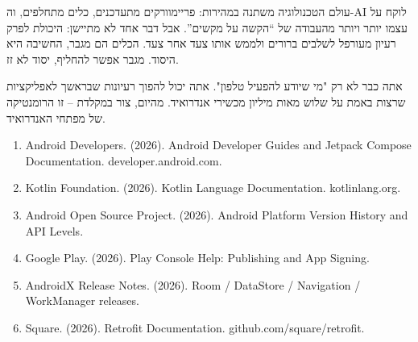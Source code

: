 עולם הטכנולוגיה משתנה במהירות: פריימוורקים מתעדכנים, כלים מתחלפים, וה-AI לוקח על עצמו יותר ויותר מהעבודה של “הקשה על מקשים”. אבל דבר אחד לא מתיישן: היכולת לפרק רעיון מעורפל לשלבים ברורים ולממש אותו צעד אחר צעד. הכלים הם מגבר, החשיבה היא היסוד. מגבר אפשר להחליף, יסוד לא זז.

אתה כבר לא רק "מי שיודע להפעיל טלפון". אתה יכול להפוך רעיונות שבראשך לאפליקציות שרצות באמת על שלוש מאות מיליון מכשירי אנדרואיד. מהיום, צור במקלדת – זו הרומנטיקה של מפתחי האנדרואיד.


\begin{enumerate}
  \item Android Developers. (2026). Android Developer Guides and Jetpack Compose Documentation. developer.android.com.
  \item Kotlin Foundation. (2026). Kotlin Language Documentation. kotlinlang.org.
  \item Android Open Source Project. (2026). Android Platform Version History and API Levels.
  \item Google Play. (2026). Play Console Help: Publishing and App Signing.
  \item AndroidX Release Notes. (2026). Room / DataStore / Navigation / WorkManager releases.
  \item Square. (2026). Retrofit Documentation. github.com/square/retrofit.
\end{enumerate}
